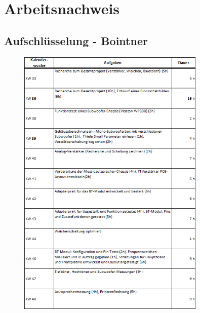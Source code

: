 \section{Arbeitsnachweis}\label{sec:8.9}
\subsection{Aufschlüsselung - Bointner}
\begin{figure} [H]
	\centering
	\includegraphics[width=0.8\textwidth]{form/ArbeitsnachweisBointner1von3.png}
\end{figure}
